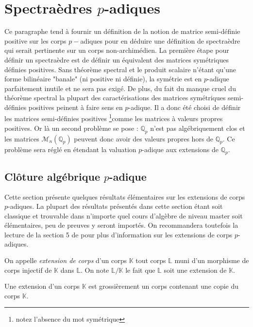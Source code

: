 \newcommand\mat{matrice semi-définie positive } 
\newcommand\Mat{Matrice semi-définie positive }
\newcommand\mats{matrices semi-définies positives }
\newcommand\Mats{Matrices semi-définies positives }


\section{Spectraèdres \texorpdfstring{$p$}{p}-adiques } 
\label{sec:spectraedre} 
Ce paragraphe tend à fournir un définition de la notion de \mat sur les corps $p-$adiques pour en déduire une définition de spectraèdre qui serait pertinente sur un corps non-archimédien. 
La première étape pour définir un spectraèdre est de définir un équivalent des matrices symétriques définies positives. Sans théorème spectral et le produit scalaire n'étant qu'une forme bilinéaire "banale" (ni positive ni définie), la symétrie est en $p$-adique parfaitement inutile et ne sera pas exigé. De plus, du fait du manque cruel du théorème spectral la plupart des caractérisations des matrices symétriques semi-définies positives peinent à faire sens en $p$-adique. 
Il a donc été choisi de définir les \mats \footnote{notez l'absence du mot symétrique}comme les matrices à valeurs propres positives.
Or là un second problème se pose : $\mathbb{Q}_{p} $ n'est pas algébriquement clos et les matrices $\mathcal{M}_n\left( \mathbb{Q}_{p}  \right) $ peuvent donc avoir des valeurs propres hors de $\mathbb{Q}_{p}$. Ce problème sera réglé en étendant la valuation $p$-adique aux extensions de $\mathbb{Q}_{p} $.

\subsection{Clôture algébrique \texorpdfstring{$p$}{p}-adique } 
Cette section présente quelques résultats élémentaires sur les extensions de corps $p$-adiques. La plupart des résultats présentés dans cette section étant soit classique et trouvable dans n'importe quel cours d'algèbre de niveau master soit élémentaires, peu de preuves y seront importés. On recommandera toutefois la lecture de la section 5 de \parencite{gouvea_p-adic_2003} pour plus d'information sur les extensions de corps $p$-adiques. 

\begin{definition}
	On appelle \textit{extension de corps} d'un corps $\mathbb{K}$ tout corps $\mathbb{L}$ muni d'un morphisme de corps injectif de $\mathbb{K}$ dans $\mathbb{L}$. On note $\mathbb{L}/\mathbb{K}$ le fait que $\mathbb{L}$ soit une extension de $\mathbb{K}.$
\end{definition}
Une extension d'un corps $\mathbb{K}$ est grossièrement un corps contenant une copie du corps $\mathbb{K}$.

